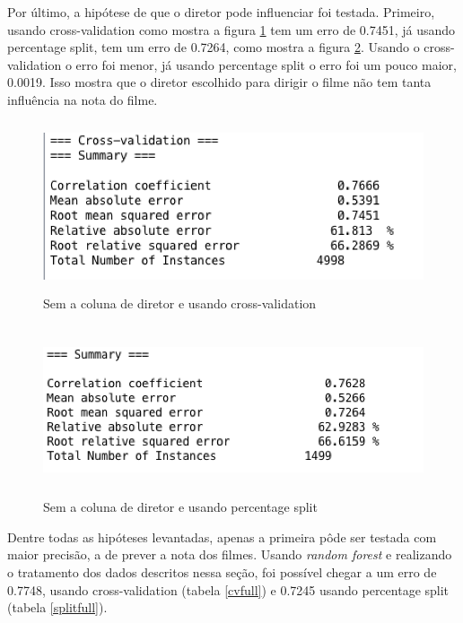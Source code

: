 Por último, a hipótese de que o diretor pode influenciar foi testada. Primeiro, usando cross-validation como mostra a figura \ref{nodirectorcv} tem um erro de 0.7451, já usando percentage split, tem um erro de 0.7264, como mostra a figura \ref{nodirectorsplit}. Usando o cross-validation o erro foi menor, já usando percentage split o erro foi um pouco maior, 0.0019. Isso mostra que o diretor escolhido para dirigir o filme não tem tanta influência na nota do filme. 

\begin{figure}[H]
\centering
\includegraphics[height=5cm]{imagens/no_director_cv.png}
\caption{Sem a coluna de diretor e usando cross-validation}
\label{nodirectorcv}
\end{figure}

\begin{figure}[H]
\centering
\includegraphics[height=5cm]{imagens/no_director_split.png}
\caption{Sem a coluna de diretor e usando percentage split}
\label{nodirectorsplit}
\end{figure}

Dentre todas as hipóteses levantadas, apenas a primeira pôde ser testada com maior precisão, a de prever a nota dos filmes. Usando \textit{random forest} e realizando o tratamento dos dados descritos nessa seção, foi possível chegar a um erro de 0.7748, usando cross-validation (tabela \ref{cvfull}) e 0.7245 usando percentage split (tabela \ref{splitfull}). 

